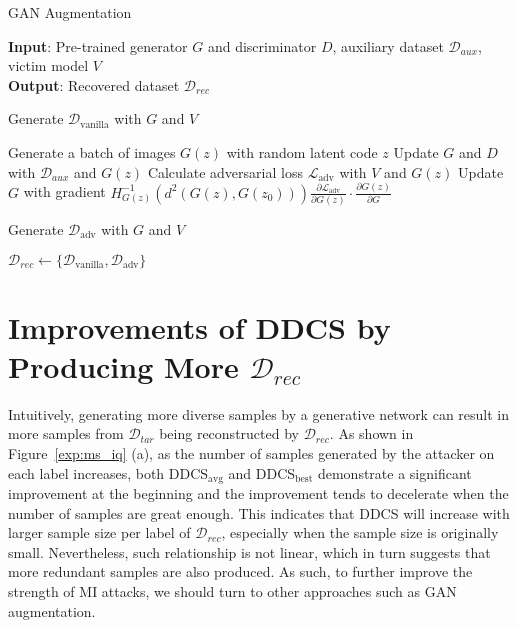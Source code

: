 \begin{algorithm}[htb]
	\caption{GAN Augmentation}
	\label{alg:gan_aug}
	\textbf{Input}: Pre-trained generator $G$ and discriminator $D$, auxiliary dataset $\mathcal{D}_{aux}$, victim model $V$ \\
	\textbf{Output}: Recovered dataset $\mathcal{D}_{rec}$
	\begin{algorithmic}[1]
	\STATE Generate $\mathcal{D}_{\text{vanilla}}$ with $G$ and $V$
	
    \STATE Generate a batch of images $G(z)$ with random latent code $z$ \label{alg2:batch_fake}
	\STATE Update $G$ and $D$ with $\mathcal{D}_{aux}$ and $G(z)$ \label{alg2:normal_train}
	\STATE Calculate adversarial loss $\mathcal{L}_{\text{adv}}$ with $V$ and $G(z)$ \label{alg2:entropy}
	\STATE Update $G$ with gradient $H^{-1}_{G(z)}(d^2(G(z),G(z_0))) \frac{\partial \mathcal{L}_{\text{adv}}}{\partial G(z)} \cdot \frac{\partial G(z)}{\partial G}$ \label{alg2:ngd}
	\ENDFOR
	
	\STATE Generate $\mathcal{D}_{\text{adv}}$ with $G$ and $V$
	
	\STATE $\mathcal{D}_{rec} \gets \{\mathcal{D}_{\text{vanilla}}, \mathcal{D}_{\text{adv}}\}$
 \end{algorithmic}
\end{algorithm}


\section{Improvements of DDCS by Producing More $\mathcal{D}_{rec}$}
Intuitively, generating more diverse samples by a generative network can result in more samples from $\mathcal{D}_{tar}$ being reconstructed by $\mathcal{D}_{rec}$.
As shown in Figure~\ref{exp:ms_iq} (a), as the number of samples generated by the attacker on each label increases, both DDCS$_{\text{avg}}$ and DDCS$_{\text{best}}$ demonstrate a significant improvement at the beginning and the improvement tends to decelerate when the number of samples are great enough.
This indicates that DDCS will increase with larger sample size per label of $\mathcal{D}_{rec}$, especially when the sample size is originally small.
Nevertheless, such relationship is not linear, which in turn suggests that more redundant samples are also produced. As such, to further improve the strength of MI attacks, we should turn to other approaches such as GAN augmentation.

